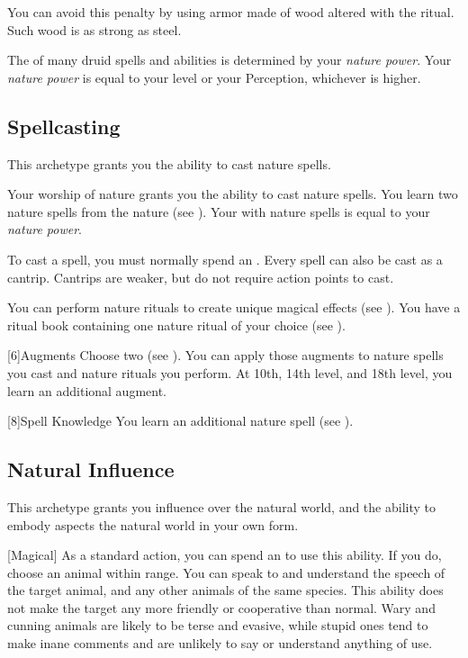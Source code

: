         You can avoid this penalty by using armor made of wood altered with the  ritual.
        Such wood is as strong as steel.

        The  of many druid spells and abilities is determined by your \textit{nature power}.
        Your \textit{nature power} is equal to your level or your Perception, whichever is higher.

    \subsection{Spellcasting}
        This archetype grants you the ability to cast nature spells.

        Your worship of nature grants you the ability to cast nature spells.
        You learn two nature spells from the nature  (see ).
        Your  with nature spells is equal to your \textit{nature power}.

        To cast a spell, you must normally spend an .
        Every spell can also be cast as a cantrip.
        Cantrips are weaker, but do not require action points to cast.

        You can perform nature rituals to create unique magical effects (see ).
        You have a ritual book containing one nature ritual of your choice (see ).

        [6]{Augments}
        Choose two  (see ).
        You can apply those augments to nature spells you cast and nature rituals you perform.
        At 10th, 14th level, and 18th level, you learn an additional augment.

        [8]{Spell Knowledge}
        You learn an additional nature spell (see ).

    \subsection{Natural Influence}
        This archetype grants you influence over the natural world, and the ability to embody aspects the natural world in your own form.

        [Magical] As a standard action, you can spend an  to use this ability.
        If you do, choose an animal within \rnglong range.
        You can speak to and understand the speech of the target animal, and any other animals of the same species.
        This ability does not make the target any more friendly or cooperative than normal.
        Wary and cunning animals are likely to be terse and evasive, while stupid ones tend to make inane comments and are unlikely to say or understand anything of use.


